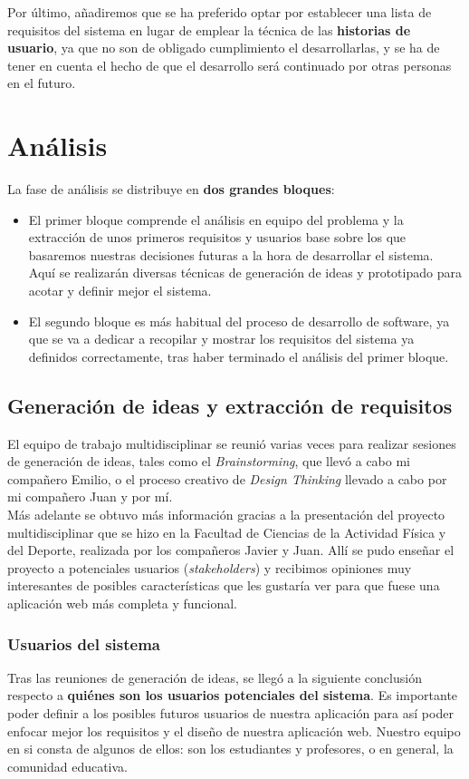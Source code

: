 Por último, añadiremos que se ha preferido optar por establecer una lista de requisitos del sistema en lugar de emplear la técnica de las \textbf{historias de usuario}, ya que no son de obligado cumplimiento el desarrollarlas, y se ha de tener en cuenta el hecho de que el desarrollo será continuado por otras personas en el futuro.

\section{Análisis}
La fase de análisis se distribuye en \textbf{dos grandes bloques}:

\begin{itemize}
    \item El primer bloque comprende el análisis en equipo del problema y la extracción de unos primeros requisitos y usuarios base sobre los que basaremos nuestras decisiones futuras a la hora de desarrollar el sistema. Aquí se realizarán diversas técnicas de generación de ideas y prototipado para acotar y definir mejor el sistema.
    \item El segundo bloque es más habitual del proceso de desarrollo de software, ya que se va a dedicar a recopilar y mostrar los requisitos del sistema ya definidos correctamente, tras haber terminado el análisis del primer bloque.
\end{itemize}

\subsection{Generación de ideas y extracción de requisitos}
El equipo de trabajo multidisciplinar se reunió varias veces para realizar sesiones de generación de ideas, tales como el \textit{Brainstorming}, que llevó a cabo mi compañero Emilio, o el proceso creativo de \textit{Design Thinking} llevado a cabo por mi compañero Juan y por mí.\\

Más adelante se obtuvo más información gracias a la presentación del proyecto multidisciplinar que se hizo en la Facultad de Ciencias de la Actividad Física y del Deporte, realizada por los compañeros Javier y Juan. Allí se pudo enseñar el proyecto a potenciales usuarios (\textit{stakeholders}) y recibimos opiniones muy interesantes de posibles características que les gustaría ver para que fuese una aplicación web más completa y funcional.

\subsubsection{Usuarios del sistema}
Tras las reuniones de generación de ideas, se llegó a la siguiente conclusión respecto a \textbf{quiénes son los usuarios potenciales del sistema}. Es importante poder definir a los posibles futuros usuarios de nuestra aplicación para así poder enfocar mejor los requisitos y el diseño de nuestra aplicación web. Nuestro equipo en si consta de algunos de ellos: son los estudiantes y profesores, o en general, la comunidad educativa.

